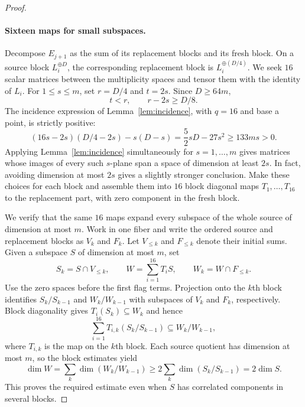 \begin{proof}
\paragraph{Sixteen maps for small subspaces.}
Decompose $E_{j+1}$ as the sum of its replacement blocks and its fresh
block.  On a source block $L_i^{\oplus D}$, the corresponding replacement
block is $L_i^{\oplus(D/4)}$.  We seek $16$ scalar matrices between the
multiplicity spaces and tensor them with the identity of $L_i$.
For $1\leq s\leq m$, set $r=D/4$ and $t=2s$.  Since $D\geq64m$,
\[
 t<r,\qquad r-2s\geq D/8.
\]
The incidence expression of Lemma~\ref{lem:incidence}, with $q=16$ and
base a point, is strictly positive:
\begin{equation}\label{bundle:small-incidence}
 (16s-2s)(D/4-2s)-s(D-s)
 =\frac52sD-27s^2
 \geq133ms>0.
\end{equation}
Applying Lemma~\ref{lem:incidence} simultaneously for $s=1,\ldots,m$ gives matrices
whose images of every such $s$-plane span a space of dimension at least
$2s$.  In fact, avoiding dimension at most $2s$ gives a slightly stronger
conclusion.  Make these choices for each block and assemble them into
$16$ block diagonal maps $T_1,\ldots,T_{16}$ to the replacement part,
with zero component in the fresh block.

We verify that the same $16$ maps expand every subspace of the whole
source of dimension at most $m$.  Work in one fiber and write the
ordered source and replacement blocks as $V_k$ and $F_k$.  Let
$V_{\leq k}$ and $F_{\leq k}$ denote their initial sums.  Given a subspace
$S$ of dimension at most $m$, set
\[
 S_k=S\cap V_{\leq k},\qquad
 W=\sum_{i=1}^{16}T_iS,\qquad
 W_k=W\cap F_{\leq k}.
\]
Use the zero spaces before the first flag terms.  Projection onto the
$k$th block identifies $S_k/S_{k-1}$ and $W_k/W_{k-1}$ with subspaces
of $V_k$ and $F_k$, respectively.  Block diagonality gives
$T_i(S_k)\subseteq W_k$ and hence
\[
 \sum_{i=1}^{16}T_{i,k}(S_k/S_{k-1})
 \subseteq W_k/W_{k-1},
\]
where $T_{i,k}$ is the map on the $k$th block.  Each source quotient has
dimension at most $m$, so the block estimates yield
\begin{equation}\label{bundle:flag-expansion}
 \dim W
 =\sum_k\dim(W_k/W_{k-1})
 \geq2\sum_k\dim(S_k/S_{k-1})
 =2\dim S.
\end{equation}
This proves the required estimate even when $S$ has correlated
components in several blocks.


\end{proof}
